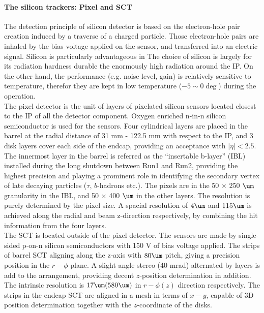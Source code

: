 \paragraph{The silicon trackers: Pixel and SCT} 
The detection principle of silicon detector is based on the electron-hole pair creation induced by a traverse of a charged particle.
Those electron-hole pairs are inhaled by the bias voltage applied on the sensor, and transferred into an electric signal. 
Silicon is particularly advantageous in 
The choice of silicon is largely for its radiation hardness durable the enormously high radiation around the IP. 
On the other hand, the performance (e.g. noise level, gain) is relatively sensitive to temperature, therefor they are kept in low temperature ($-5 \sim 0\deg$) during the operation.  \\

The pixel detector is the unit of layers of pixelated silicon sensors located closest to the IP of all the detector component. 
Oxygen enriched n-in-n silicon semiconductor is used for the sensors.
Four cylindrical layers are placed in the barrel at the radial distance of 31 mm - 122.5 mm with respect to the IP, 
and 3 disk layers cover each side of the endcap, providing an acceptance with $|\eta|<2.5$. 
The innermost layer in the barrel is referred as the ``insertable b-layer'' (IBL) installed during the long shutdown between Run1 and Run2, providing the highest precision and playing a prominent role in identifying the secondary vertex of late decaying particles ($\tau$, $b$-hadrons etc.). 
The pixels are in the 50 $\times$ 250 $\um$ granularity in the IBL, and 50 $\times$ 400 $\um$ in the other layers. 
The resolution is purely determined by the pixel size. A spacial resolution of $4\um$ and $115\um$ is achieved along the radial and beam z-direction respectively, 
by combining the hit information from the four layers. \\

The SCT is located outside of the pixel detector. The sensors are made by single-sided p-on-n silicon semiconductors with 150 V of bias voltage applied. %
The strips of barrel SCT aligning along the z-axis with $80\um$ pitch, giving a precision position in the $r-\phi$ plane. 
A slight angle stereo (40 mrad) alternated by layers is add to the arrangement, providing decent $z$-position determination in addition. 
The intrinsic resolution is $17\um (580\um)$ in $r-\phi (z)$ direction respectively.
The strips in the endcap SCT are aligned in a mesh in terms of $x-y$, capable of 3D position determination together with the $z$-coordinate of the disks.

